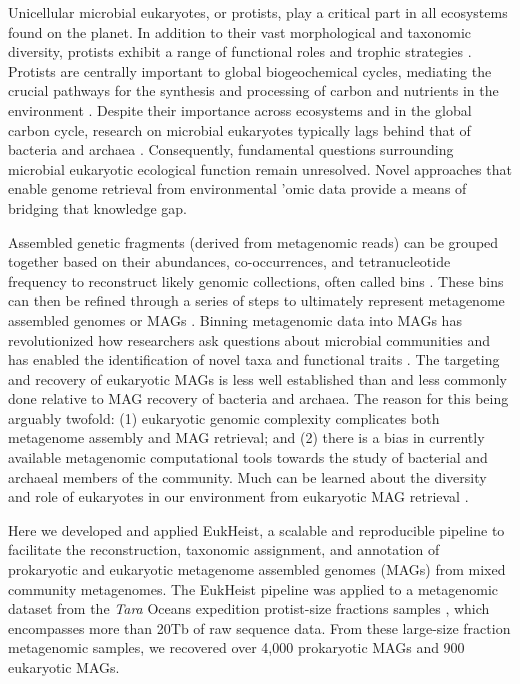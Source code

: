 \documentclass[12pt]{article}
\numberwithin{equation}{section}
\begin{document}
Unicellular microbial eukaryotes, or protists, play a critical part in all ecosystems found on the planet. In addition to their vast morphological and taxonomic diversity, protists exhibit a range of functional roles and trophic strategies \citep{Caron2011Marine}. Protists are centrally important to global biogeochemical cycles, mediating the crucial pathways for the synthesis and processing of carbon and nutrients in the environment \citep{mitra2014role,Caron2017Probing,strom2008microbial}. Despite their importance across ecosystems and in the global carbon cycle, research on microbial eukaryotes typically lags behind that of bacteria and archaea \citep{Caron2009Hypotheses, Keeling2017Marine}. Consequently, fundamental questions surrounding microbial eukaryotic ecological function remain unresolved. Novel approaches that enable genome retrieval from environmental 'omic data provide a means of bridging that knowledge gap. 

Assembled genetic fragments (derived from metagenomic reads) can be grouped together based on their abundances, co-occurrences, and tetranucleotide frequency to reconstruct likely genomic collections, often called bins \citep{Alneberg2014Binning, Wu2014MaxBin, Kang_2019, Graham2017BinSanity}. These bins can then be refined through a series of steps to ultimately represent metagenome assembled genomes or MAGs  \citep{Parks2017Recovery, Delmont2018Nitrogen-fixing, Tully2018reconstruction, Almeida2019new}. Binning metagenomic data into MAGs has revolutionized how researchers ask questions about microbial communities and has enabled the identification of novel taxa and functional traits \citep{Rinke2019phylogenomic, Tully2019Metabolic}. The targeting and recovery of eukaryotic MAGs is less well established than and less commonly done relative to MAG recovery of bacteria and archaea. The reason for this being arguably twofold: (1) eukaryotic genomic complexity \citep{Zhang2011practical} complicates both metagenome assembly and MAG retrieval; and (2) there is a bias in currently available metagenomic computational tools towards the study of bacterial and archaeal members of the community. Much can be learned about the diversity and role of eukaryotes in our environment from eukaryotic MAG retrieval \citep{Olm2019Genome-resolved}.

Here we developed and applied EukHeist, a scalable and reproducible pipeline to facilitate the reconstruction, taxonomic assignment, and annotation of prokaryotic and eukaryotic metagenome assembled genomes (MAGs) from mixed community metagenomes. The EukHeist pipeline was applied to a metagenomic dataset from the \textit{Tara} Oceans expedition protist-size fractions samples \citep{Carradec2018global}, which encompasses more than 20Tb of raw sequence data. From these large-size fraction metagenomic samples, we recovered over 4,000 prokaryotic MAGs and 900 eukaryotic MAGs. 
\end{document}
